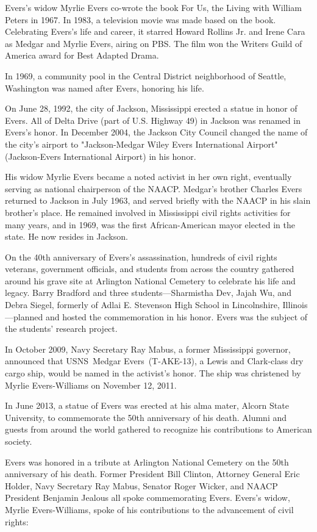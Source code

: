 Evers's widow Myrlie Evers co-wrote the book For Us, the Living with
William Peters in 1967. In 1983, a television movie was made based on
the book. Celebrating Evers's life and career, it starred Howard Rollins
Jr. and Irene Cara as Medgar and Myrlie Evers, airing on PBS. The film
won the Writers Guild of America award for Best Adapted Drama.

In 1969, a community pool in the Central District neighborhood of
Seattle, Washington was named after Evers, honoring his life.

On June 28, 1992, the city of Jackson, Mississippi erected a statue in
honor of Evers. All of Delta Drive (part of U.S. Highway 49) in Jackson
was renamed in Evers's honor. In December 2004, the Jackson City Council
changed the name of the city's airport to "Jackson-Medgar Wiley Evers
International Airport" (Jackson-Evers International Airport) in his
honor.

His widow Myrlie Evers became a noted activist in her own right,
eventually serving as national chairperson of the NAACP. Medgar's
brother Charles Evers returned to Jackson in July 1963, and served
briefly with the NAACP in his slain brother's place. He remained
involved in Mississippi civil rights activities for many years, and in
1969, was the first African-American mayor elected in the state. He now
resides in Jackson.

On the 40th anniversary of Evers's assassination, hundreds of civil
rights veterans, government officials, and students from across the
country gathered around his grave site at Arlington National Cemetery to
celebrate his life and legacy. Barry Bradford and three
students---Sharmistha Dev, Jajah Wu, and Debra Siegel, formerly of Adlai
E. Stevenson High School in Lincolnshire, Illinois---planned and hosted
the commemoration in his honor. Evers was the subject of the students'
research project.

In October 2009, Navy Secretary Ray Mabus, a former Mississippi
governor, announced that USNS~Medgar Evers~(T-AKE-13), a Lewis and
Clark-class dry cargo ship, would be named in the activist's honor. The
ship was christened by Myrlie Evers-Williams on November 12, 2011.

In June 2013, a statue of Evers was erected at his alma mater, Alcorn
State University, to commemorate the 50th anniversary of his death.
Alumni and guests from around the world gathered to recognize his
contributions to American society.

Evers was honored in a tribute at Arlington National Cemetery on the
50th anniversary of his death. Former President Bill Clinton, Attorney
General Eric Holder, Navy Secretary Ray Mabus, Senator Roger Wicker, and
NAACP President Benjamin Jealous all spoke commemorating Evers. Evers's
widow, Myrlie Evers-Williams, spoke of his contributions to the
advancement of civil rights:

